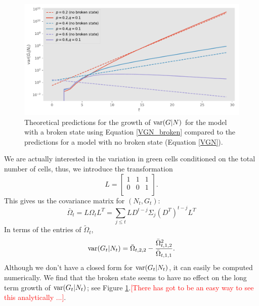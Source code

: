 \documentclass{article}
\begin{document}
 
\begin{figure}[h!]
\centering
\includegraphics[scale=0.6]{figS2.pdf}
\caption{ Theoretical predictions for the growth of ${\rm var}(G|N)$ for the model with a broken state using Equation \ref{VGN_broken} compared to the predictions for a model with no broken state (Equation \ref{VGN}).  }\label{fig:S2}
\end{figure}

 We are actually interested in the variation in green cells conditioned on the total number of cells, thus, we introduce the transformation 
 \begin{equation}
 L = \left[ \begin{array}{ccc}
1  & 1 &1 \\
0  & 0& 1 \\
\end{array}\right].
 \end{equation} 
 This gives us the covariance matrix for $(N_t,G_t)$:
 \begin{equation}
  \bar{\Omega}_{t} =L\Omega_t L^T =  \sum_{j\le t}LD^{t-j}\Sigma_j \left(D^T\right)^{t-j}L^T
 \end{equation}
 In terms of the entries of $ \tilde{\Omega}_{t}$, 
 \begin{equation}\label{VGN_broken}
 {\rm var}(G_t|N_t) = \bar{\Omega}_{t,2,2} - \frac{\bar{\Omega}_{t,1,2}^2}{ \bar{\Omega}_{t,1,1} }. 
 \end{equation}
Although we don't have a closed form for ${\rm var}(G_t|N_t)$, it can easily be computed numerically. We find that the broken state seems to have no effect on the long term growth of  ${\rm var}(G_t|N_t)$; see Figure \ref{fig:S2}.\textcolor{red}{[There has got to be an easy way to see this analytically ...]}. 








\end{document}
